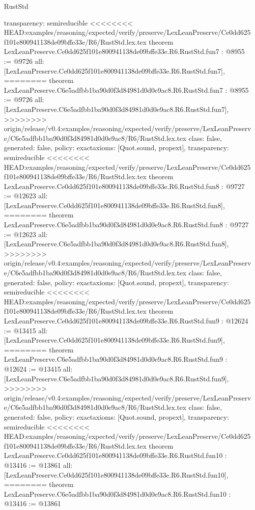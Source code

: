 \begin{lexlean}{RustStd}
\begin{coremodule}
{\begin{coremodule}
{{{{{{{{{{  transparency: semireducible
}
<<<<<<<< HEAD:examples/reasoning/expected/verify/preserve/LexLeanPreserve/Ce0dd625f101e800941138de09bffe33e/R6/RustStd.lex.tex
theorem LexLeanPreserve.Ce0dd625f101e800941138de09bffe33e.R6.RustStd.fun7 : @8955 := @9726 {
  all: [LexLeanPreserve.Ce0dd625f101e800941138de09bffe33e.R6.RustStd.fun7],
========
theorem LexLeanPreserve.C6e5adfbb1ba90d0f3d84981d0d0e9ac8.R6.RustStd.fun7 : @8955 := @9726 {
  all: [LexLeanPreserve.C6e5adfbb1ba90d0f3d84981d0d0e9ac8.R6.RustStd.fun7],
>>>>>>>> origin/release/v0.4:examples/reasoning/expected/verify/preserve/LexLeanPreserve/C6e5adfbb1ba90d0f3d84981d0d0e9ac8/R6/RustStd.lex.tex
  class: false,
  generated: false,
  policy: exact{axioms: [Quot.sound, propext]},
  transparency: semireducible
}
<<<<<<<< HEAD:examples/reasoning/expected/verify/preserve/LexLeanPreserve/Ce0dd625f101e800941138de09bffe33e/R6/RustStd.lex.tex
theorem LexLeanPreserve.Ce0dd625f101e800941138de09bffe33e.R6.RustStd.fun8 : @9727 := @12623 {
  all: [LexLeanPreserve.Ce0dd625f101e800941138de09bffe33e.R6.RustStd.fun8],
========
theorem LexLeanPreserve.C6e5adfbb1ba90d0f3d84981d0d0e9ac8.R6.RustStd.fun8 : @9727 := @12623 {
  all: [LexLeanPreserve.C6e5adfbb1ba90d0f3d84981d0d0e9ac8.R6.RustStd.fun8],
>>>>>>>> origin/release/v0.4:examples/reasoning/expected/verify/preserve/LexLeanPreserve/C6e5adfbb1ba90d0f3d84981d0d0e9ac8/R6/RustStd.lex.tex
  class: false,
  generated: false,
  policy: exact{axioms: [Quot.sound, propext]},
  transparency: semireducible
}
<<<<<<<< HEAD:examples/reasoning/expected/verify/preserve/LexLeanPreserve/Ce0dd625f101e800941138de09bffe33e/R6/RustStd.lex.tex
theorem LexLeanPreserve.Ce0dd625f101e800941138de09bffe33e.R6.RustStd.fun9 : @12624 := @13415 {
  all: [LexLeanPreserve.Ce0dd625f101e800941138de09bffe33e.R6.RustStd.fun9],
========
theorem LexLeanPreserve.C6e5adfbb1ba90d0f3d84981d0d0e9ac8.R6.RustStd.fun9 : @12624 := @13415 {
  all: [LexLeanPreserve.C6e5adfbb1ba90d0f3d84981d0d0e9ac8.R6.RustStd.fun9],
>>>>>>>> origin/release/v0.4:examples/reasoning/expected/verify/preserve/LexLeanPreserve/C6e5adfbb1ba90d0f3d84981d0d0e9ac8/R6/RustStd.lex.tex
  class: false,
  generated: false,
  policy: exact{axioms: [Quot.sound, propext]},
  transparency: semireducible
}
<<<<<<<< HEAD:examples/reasoning/expected/verify/preserve/LexLeanPreserve/Ce0dd625f101e800941138de09bffe33e/R6/RustStd.lex.tex
theorem LexLeanPreserve.Ce0dd625f101e800941138de09bffe33e.R6.RustStd.fun10 : @13416 := @13861 {
  all: [LexLeanPreserve.Ce0dd625f101e800941138de09bffe33e.R6.RustStd.fun10],
========
theorem LexLeanPreserve.C6e5adfbb1ba90d0f3d84981d0d0e9ac8.R6.RustStd.fun10 : @13416 := @13861 {
}}}}}}}}}}}}}}
\end{coremodule}}
\end{coremodule}
\end{lexlean}

